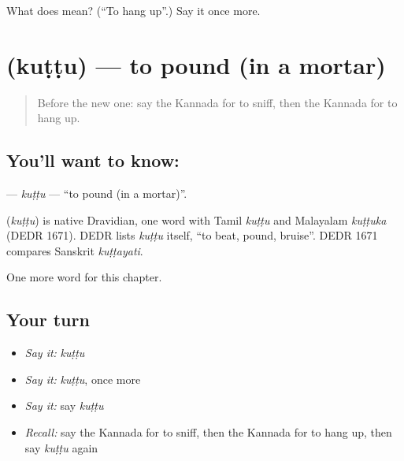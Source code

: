 \begin{tcolorbox}[breakable,colback=teal!4,colframe=teal!35!black,title={Before you move on}]
What does  mean? (\textquotedblleft{}To hang up\textquotedblright{}.) Say it once more.
\end{tcolorbox}
\section[\texorpdfstring{\kn{ಕುಟ್ಟು} (kuṭṭu)}{ಕುಟ್ಟು (kuṭṭu)}]{ (kuṭṭu) — to pound (in a mortar)}

\label{lesson:KA-C207-kuttu}



\begin{quote}
Before the new one: say the Kannada for to sniff, then the Kannada for to hang up.
\end{quote}

\subsection*{You'll want to know: }
\textbf{} — \emph{kuṭṭu} — \textquotedblleft{}to pound (in a mortar)\textquotedblright{}.

\begin{cousinweb}
\textbf{} (\emph{kuṭṭu}) is native Dravidian, one word with Tamil \emph{kuṭṭu} and Malayalam \emph{kuṭṭuka} (DEDR 1671). DEDR lists \emph{kuṭṭu} itself, \textquotedblleft{}to beat, pound, bruise\textquotedblright{}. DEDR 1671 compares Sanskrit \emph{kuṭṭayati}.
\end{cousinweb}

\begin{grammarlens}[title={What you've built}]
One more word for this chapter.
\end{grammarlens}

\subsection*{Your turn}
\begin{itemize}
\raggedright
  \item \emph{Say it:} \emph{kuṭṭu}
  \item \emph{Say it:} \emph{kuṭṭu}, once more
  \item \emph{Say it:} say \emph{kuṭṭu}
  \item \emph{Recall:} say the Kannada for to sniff, then the Kannada for to hang up, then say \emph{kuṭṭu} again
\end{itemize}

